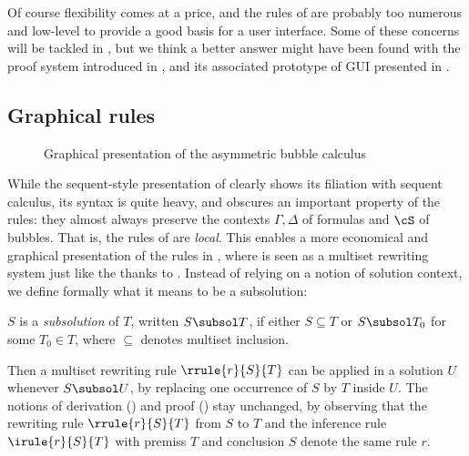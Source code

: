 Of course flexibility comes at a price, and the rules of  are probably
too numerous and low-level to provide a good basis for a user interface. Some of
these concerns will be tackled in , but we think a better
answer might have been found with the proof system introduced in
, and its associated prototype of GUI presented in
.


\subsection{Graphical rules}

\begin{figure*}
  
  \caption{Graphical presentation of the asymmetric bubble calculus }
\end{figure*}

While the sequent-style presentation of  clearly shows its filiation
with sequent calculus, its syntax is quite heavy, and obscures an important
property of the rules: they almost always preserve the contexts $\Gamma, \Delta$
of formulas and $\cS$ of bubbles. That is, the rules of  are
\emph{local}. This enables a more economical and graphical presentation of the
rules in , where  is seen as a multiset rewriting
system just like the {\cham} thanks to . Instead of relying on
a notion of solution context, we define formally what it means to be a
subsolution:

\begin{definition}[Subsolution]
  $S$ is a \emph{subsolution} of $T$, written $S \subsol T$, if either $S
  \subseteq T$ or $S \subsol T_0$ for some $T_0 \in T$, where $\subseteq$
  denotes multiset inclusion. 
\end{definition}

Then a multiset rewriting rule $\rrule{r}{S}{T}$ can be applied in a
solution $U$ whenever $S \subsol U$, by replacing one occurrence of $S$ by $T$
inside $U$. The notions of derivation () and proof
() stay unchanged, by observing that the rewriting rule
$\rrule{r}{S}{T}$ from $S$ to $T$ and the inference rule
$\irule{r}{S}{T}$ with premiss $T$ and conclusion $S$ denote the same
rule $r$.

